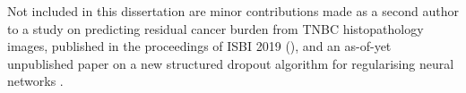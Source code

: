 Not included in this dissertation are minor contributions made as a second author to a study on predicting residual cancer burden from TNBC histopathology images, published in the proceedings of ISBI 2019 (\cite{naylor2019predicting}), and an as-of-yet unpublished paper on a new structured dropout algorithm for regularising neural networks \cite{khalfaoui2019adaptive}.


